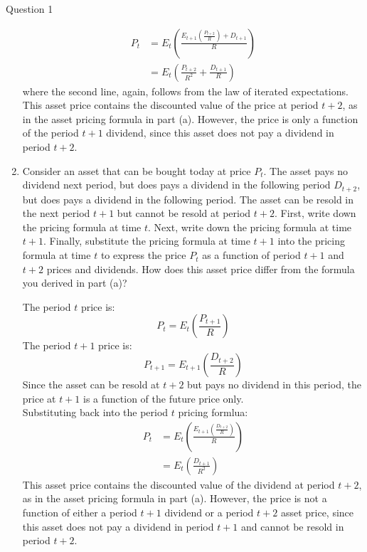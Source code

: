 \documentclass[a4paper]{article}
\begin{document}
\begin{questionbox}{Question 1}
\begin{enumerate}[resume*]
\begin{explanationbox}
\begin{align*}
					P_t &= E_t \left( \frac{E_{t+1} \left( \frac{P_{t+2}}{R} \right) + D_{t+1}}{R} \right)\\
					&=E_t \left( \frac{P_{t+2}}{R^2} + \frac{D_{t+1}}{R} \right)
				\end{align*}
				where the second line, again, follows from the law of iterated expectations.\\
				This asset price contains the discounted value of the price at period \( t+2 \), as in the asset pricing formula in part (a). However, the price is only a function of the period \( t+1 \) dividend, since this asset does not pay a dividend in period \( t+2 \).
			\end{explanationbox}
			\item Consider an asset that can be bought today at price \( P_t \). The asset pays no dividend next period, but does pays a dividend in the following period \( D_{t+2} \), but does pays a dividend in the following period. The asset can be resold in the next period \( t+1 \) but cannot be resold at period \( t+2 \). First, write down the pricing formula at time \( t \). Next, write down the pricing formula at time \( t+1 \). Finally, substitute the pricing formula at time \( t+1 \) into the pricing formula at time \( t \) to express the price \( P_t \) as a function of period \( t+1 \) and \( t+2 \) prices and dividends. How does this asset price differ from the formula you derived in part (a)?
			\begin{explanationbox}
				The period \( t \) price is:
				\[
					P_t = E_t \left( \frac{P_{t+1}}{R} \right)
				\]
				The period \( t+1 \) price is:
				\[
					P_{t+1} = E_{t+1}\left( \frac{D_{t+2}}{R} \right)
				\]
				Since the asset can be resold at \( t+2 \) but pays no dividend in this period, the price at \( t+1 \) is a function of the future price only.\\
				Substituting back into the period \( t \) pricing formlua:
				\begin{align*}
					P_t &= E_t \left( \frac{E_{t+1} \left( \frac{D_{t+2}}{R} \right)}{R} \right)\\
					&=E_t \left( \frac{D_{t+1}}{R^2} \right)
				\end{align*}
				This asset price contains the discounted value of the dividend at period \( t+2 \), as in the asset pricing formula in part (a). However, the price is not a function of either a period \( t+1 \) dividend or a period \( t+2 \) asset price, since this asset does not pay a dividend in period \( t+1 \) and cannot be resold in period \( t+2 \).
			\end{explanationbox}
		\end{enumerate}
	\end{questionbox}
\end{document}
